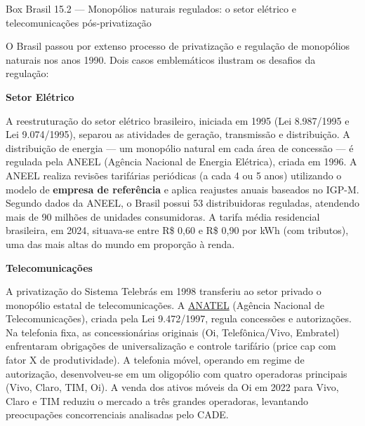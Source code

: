 \documentclass[11pt,twoside,openright]{book}
\begin{document}
\begin{boxbrasilbox}{Box Brasil 15.2 — Monopólios naturais regulados: o setor elétrico e telecomunicações pós-privatização}

O Brasil passou por extenso processo de privatização e regulação de
monopólios naturais nos anos 1990. Dois casos emblemáticos ilustram os
desafios da regulação:

\textbf{Setor Elétrico}

A reestruturação do setor elétrico brasileiro, iniciada em 1995 (Lei
8.987/1995 e Lei 9.074/1995), separou as atividades de geração,
transmissão e distribuição. A distribuição de energia --- um monopólio
natural em cada área de concessão --- é regulada pela ANEEL (Agência
Nacional de Energia Elétrica), criada em 1996. A ANEEL realiza revisões
tarifárias periódicas (a cada 4 ou 5 anos) utilizando o modelo de
\textbf{empresa de referência} e aplica reajustes anuais baseados no
IGP-M. Segundo dados da ANEEL, o Brasil possui 53 distribuidoras
reguladas, atendendo mais de 90 milhões de unidades consumidoras. A
tarifa média residencial brasileira, em 2024, situava-se entre R\$ 0,60
e R\$ 0,90 por kWh (com tributos), uma das mais altas do mundo em
proporção à renda.

\textbf{Telecomunicações}

A privatização do Sistema Telebrás em 1998 transferiu ao setor privado o
monopólio estatal de telecomunicações. A
\href{https://www.anatel.gov.br}{ANATEL} (Agência Nacional de
Telecomunicações), criada pela Lei 9.472/1997, regula concessões e
autorizações. Na telefonia fixa, as concessionárias originais (Oi,
Telefônica/Vivo, Embratel) enfrentaram obrigações de universalização e
controle tarifário (price cap com fator X de produtividade). A telefonia
móvel, operando em regime de autorização, desenvolveu-se em um
oligopólio com quatro operadoras principais (Vivo, Claro, TIM, Oi). A
venda dos ativos móveis da Oi em 2022 para Vivo, Claro e TIM reduziu o
mercado a três grandes operadoras, levantando preocupações
concorrenciais analisadas pelo CADE.


\end{boxbrasilbox}
\end{document}
